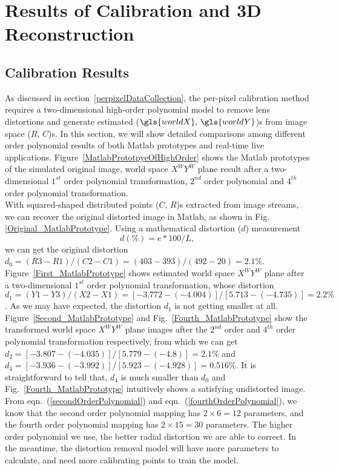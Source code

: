 \chapter{Results of Calibration and \gls{3D} Reconstruction} %
\label{chapterCaliResultsReconstruction} %
\section{Calibration Results}
\label{sectionPrototypeTwoDtransformation} 
As discussed in section~\ref{perpixelDataCollection}, the per-pixel calibration method requires a two-dimensional high-order polynomial model to remove lens distortions and generate estimated (\(\gls{worldX},\, \gls{worldY}\))s from image space (\(R, \, C\))s. In this section, we will show detailed comparisons among different order polynomial results of both Matlab prototypes and real-time live applications. Figure~\ref{MatlabPrototpyeOfHighOrder} shows the Matlab prototypes of the simulated original image, world space \(X^WY^W\) plane result after a two-dimensional \(1^{st}\) order polynomial transformation, \(2^{nd}\) order polynomial and \(4^{th}\) order polynomial transformation. %
%
\\\indent
With squared-shaped distributed points (\(C,\, R\))s extracted from image streams, we can recover the original distorted image in Matlab, as shown in Fig.\ref{Original_MatlabPrototype}. Using a mathematical distortion (\(d\)) measurement \cite{distortionMeasurement_2012}
%
\begin{equation}
d (\%)=  e*100/L ,
\label{mathematicalDistortion}
\end{equation}%
%
\noindent
we can get the original distortion \(d_0 = (R3 - R1) / (C2 -C1) = (403 - 393) / (492 - 20) = 2.1\%\). Figure~\ref{First_MatlabPrototype} shows estimated world space \(X^WY^W\) plane after a two-dimensional \(1^{st}\) order polynomial transformation, whose distortion \(d_1 = (Y1 - Y3) / (X2 -X1) = [-3.772 - (-4.004)] / [5.713 - (-4.735)] = 2.2\%\). As we may have expected, the distortion \(d_1\) is not getting smaller at all. Figure~\ref{Second_MatlabPrototype} and Fig.~\ref{Fourth_MatlabPrototype} show the transformed world space \(X^WY^W\) plane images after the \(2^{nd}\) order and \(4^{th}\) order polynomial transformation respectively, from which we can get \(d_2 = [-3.807 - (-4.035)] / [5.779 - (-4.8)] = 2.1\%\) and \(d_4 = [-3.936 - (-3.992)] / [5.923 - (-4.928)] = 0.516\%\). It is straightforward to tell that, \(d_4\) is much smaller than \(d_0\) and Fig.~\ref{Fourth_MatlabPrototype} intuitively shows a satisfying undistorted image. From eqn.~(\ref{secondOrderPolynomial}) and eqn.~(\ref{fourthOrderPolynomial}), we know that the second order polynomial mapping has $2\times6=12$ parameters, and the fourth order polynomial mapping has $2\times15=30$ parameters. The higher order polynomial we use, the better radial distortion we are able to correct. In the meantime, the distortion removal model will have more parameters to calculate, and need more calibrating points to train the model.%
